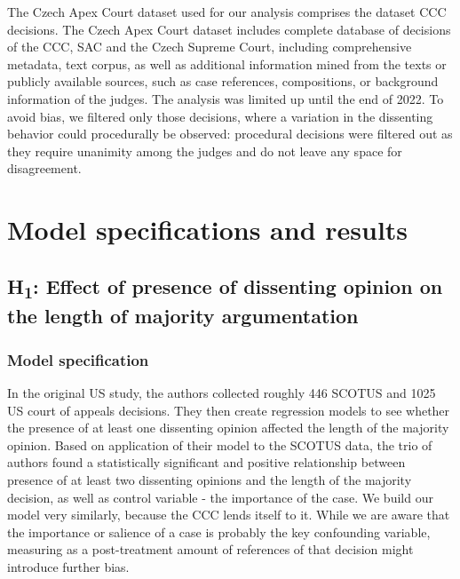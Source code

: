 \documentclass[
  11pt,
]{article}
\begin{document}
The Czech Apex Court dataset used for our analysis comprises the dataset
CCC decisions. The Czech Apex Court dataset includes complete database
of decisions of the CCC, SAC and the Czech Supreme Court, including
comprehensive metadata, text corpus, as well as additional information
mined from the texts or publicly available sources, such as case
references, compositions, or background information of the judges. The
analysis was limited up until the end of 2022. To avoid bias, we
filtered only those decisions, where a variation in the dissenting
behavior could procedurally be observed: procedural decisions were
filtered out as they require unanimity among the judges and do not leave
any space for disagreement.

\hypertarget{model-specifications-and-results}{%
\section{Model specifications and
results}\label{model-specifications-and-results}}

\hypertarget{h1-effect-of-presence-of-dissenting-opinion-on-the-length-of-majority-argumentation}{%
\subsection{\texorpdfstring{H\textsubscript{1}: Effect of presence of
dissenting opinion on the length of majority
argumentation}{H1: Effect of presence of dissenting opinion on the length of majority argumentation}}\label{h1-effect-of-presence-of-dissenting-opinion-on-the-length-of-majority-argumentation}}

\hypertarget{model-specification}{%
\subsubsection{Model specification}\label{model-specification}}

In the original US study, the authors collected roughly 446 SCOTUS and
1025 US court of appeals decisions. They then create regression models
to see whether the presence of at least one dissenting opinion affected
the length of the majority opinion. Based on application of their model
to the SCOTUS data, the trio of authors found a statistically
significant and positive relationship between presence of at least two
dissenting opinions and the length of the majority decision, as well as
control variable - the importance of the case. We build our model very
similarly, because the CCC lends itself to it. While we are aware that
the importance or salience of a case is probably the key confounding
variable, measuring as a post-treatment amount of references of that
decision might introduce further bias.
\end{document}
